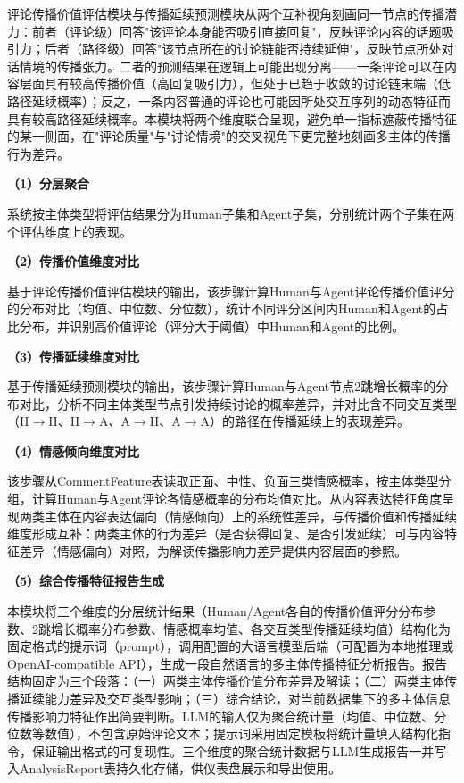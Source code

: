 评论传播价值评估模块与传播延续预测模块从两个互补视角刻画同一节点的传播潜力：前者（评论级）回答"该评论本身能否吸引直接回复"，反映评论内容的话题吸引力；后者（路径级）回答"该节点所在的讨论链能否持续延伸"，反映节点所处对话情境的传播张力。二者的预测结果在逻辑上可能出现分离——一条评论可以在内容层面具有较高传播价值（高回复吸引力），但处于已趋于收敛的讨论链末端（低路径延续概率）；反之，一条内容普通的评论也可能因所处交互序列的动态特征而具有较高路径延续概率。本模块将两个维度联合呈现，避免单一指标遮蔽传播特征的某一侧面，在"评论质量"与"讨论情境"的交叉视角下更完整地刻画多主体的传播行为差异。

\textbf{（1）分层聚合}

系统按主体类型将评估结果分为Human子集和Agent子集，分别统计两个子集在两个评估维度上的表现。

\textbf{（2）传播价值维度对比}

基于评论传播价值评估模块的输出，该步骤计算Human与Agent评论传播价值评分的分布对比（均值、中位数、分位数），统计不同评分区间内Human和Agent的占比分布，并识别高价值评论（评分大于阈值）中Human和Agent的比例。

\textbf{（3）传播延续维度对比}

基于传播延续预测模块的输出，该步骤计算Human与Agent节点2跳增长概率的分布对比，分析不同主体类型节点引发持续讨论的概率差异，并对比含不同交互类型（H$\to$H、H$\to$A、A$\to$H、A$\to$A）的路径在传播延续上的表现差异。

\textbf{（4）情感倾向维度对比}

该步骤从CommentFeature表读取正面、中性、负面三类情感概率，按主体类型分组，计算Human与Agent评论各情感概率的分布均值对比。从内容表达特征角度呈现两类主体在内容表达偏向（情感倾向）上的系统性差异，与传播价值和传播延续维度形成互补：两类主体的行为差异（是否获得回复、是否引发延续）可与内容特征差异（情感偏向）对照，为解读传播影响力差异提供内容层面的参照。

\textbf{（5）综合传播特征报告生成}

本模块将三个维度的分层统计结果（Human/Agent各自的传播价值评分分布参数、2跳增长概率分布参数、情感概率均值、各交互类型传播延续均值）结构化为固定格式的提示词（prompt），调用配置的大语言模型后端（可配置为本地推理或OpenAI-compatible API），生成一段自然语言的多主体传播特征分析报告。报告结构固定为三个段落：（一）两类主体传播价值分布差异及解读；（二）两类主体传播延续能力差异及交互类型影响；（三）综合结论，对当前数据集下的多主体信息传播影响力特征作出简要判断。LLM的输入仅为聚合统计量（均值、中位数、分位数等数值），不包含原始评论文本；提示词采用固定模板将统计量填入结构化指令，保证输出格式的可复现性。三个维度的聚合统计数据与LLM生成报告一并写入AnalysisReport表持久化存储，供仪表盘展示和导出使用。

